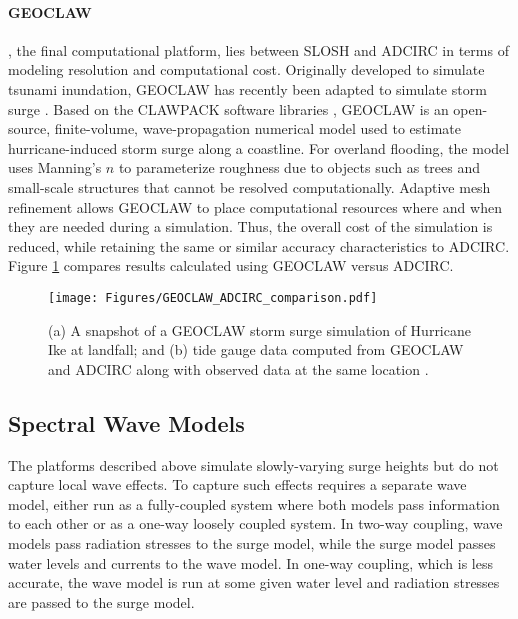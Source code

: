 \paragraph{GEOCLAW} , the final computational platform, lies between SLOSH and ADCIRC in terms of modeling resolution and computational cost. Originally developed to simulate tsunami inundation, GEOCLAW has recently been adapted to simulate storm surge \citep{berger2011geoclaw, mandli2016clawpack}. Based on the CLAWPACK software libraries \citep{leveque2002finite}, GEOCLAW is an open-source, finite-volume, wave-propagation numerical model used to estimate hurricane-induced storm surge along a coastline. For overland flooding, the model uses Manning's $n$ to parameterize roughness due to objects such as trees and small-scale structures that cannot be resolved computationally. Adaptive mesh refinement allows GEOCLAW to place computational resources where and when they are needed during a simulation. Thus, the overall cost of the simulation is reduced, while retaining the same or similar accuracy characteristics to ADCIRC. Figure \ref{fig:GEOCLAW_ADCIRC_comparison} compares results calculated using GEOCLAW versus ADCIRC. 

\begin{figure}[htb]
    \centering
    \texttt{[image: Figures/GEOCLAW\_ADCIRC\_comparison.pdf]}
    \caption{(a) A snapshot of a GEOCLAW storm surge simulation of Hurricane Ike at landfall; and (b) tide gauge data computed from GEOCLAW and ADCIRC along with observed data at the same location \citep{mandli2016clawpack}.}
    \label{fig:GEOCLAW_ADCIRC_comparison}
\end{figure}

\subsection{Spectral Wave Models}

The platforms described above simulate slowly-varying surge heights but do not capture local wave effects. To capture such effects requires a separate wave model, either run as a fully-coupled system where both models pass information to each other or as a one-way loosely coupled system. In two-way coupling, wave models pass radiation stresses to the surge model, while the surge model passes water levels and currents to the wave model. In one-way coupling, which is less accurate, the wave model is run at some given water level and radiation stresses are passed to the surge model.

